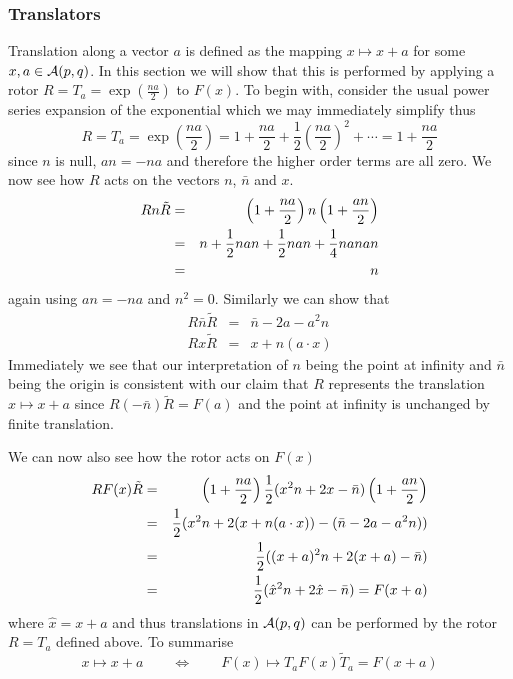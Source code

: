 \subsubsection{Translators}

Translation along a vector $a$ is defined as the
mapping $x\mapsto x+a$ for some $x,a \in \mathcal{A}(p,q)$. In this
section we will show that this is performed by applying a 
rotor $R=T_a = \exp\left({\frac{na}{2}}\right)$ to $F(x)$.
To begin with, consider the usual power series expansion of the exponential
which we may immediately simplify thus
%
\begin{equation}
R=T_a = \exp\left({\frac{na}{2}}\right) = 1 + \frac{na}{2} +
\frac{1}{2}\left(\frac{na}{2}\right)^2 + \cdots   = 1 +
\frac{na}{2}
\end{equation}
%
since $n$ is null, $an = -na$ and therefore the higher order terms are all
zero. We now see how $R$ acts on the vectors $n$, $\bar{n}$ and $x$.
%
\begin{eqnarray}
 Rn\tilde{R} & = & \left(1 + \frac{na}{2}\right)n\left(1 + \frac{an}{2}\right) \nonumber \\
                & = &  n + \frac{1}{2}nan + \frac{1}{2}nan + \frac{1}{4}nanan \nonumber \\
                & = & n
                \label{rntrans}
\end{eqnarray}
%
again using  $an= - na$ and $n^2=0$.    Similarly we can
show that
%
\begin{eqnarray}
 R\bar{n}\tilde{R} & = &  \bar{n}  - 2a - a^2n \\
 Rx\tilde{R}          & = &  x + n(a\cdot x)
\end{eqnarray}
%
Immediately we see that our interpretation of $n$ being the point at
infinity and $\bar{n}$ being the origin is consistent with our claim that
$R$ represents the translation $x \mapsto x+a$ since $R(-\bar{n})\tilde{R} = F(a)$
and the point at infinity is unchanged by finite translation.

We can now also see how the rotor acts on $F(x)$
%
\begin{eqnarray}
RF(x)\tilde{R} & = & \left(1 + \frac{na}{2}\right)\frac{1}{2}(x^2n + 2x - \bar{n})\left(1 + \frac{an}{2}\right) \nonumber \\
                & = &  \frac{1}{2}(x^2n + 2(x + n(a\cdot x)) - (\bar{n} - 2a - a^2n))   \nonumber \\
                & = &  \frac{1}{2}((x+a)^2n + 2(x+a) - \bar{n}) \nonumber \\
                & = &  \frac{1}{2}(\hat{x}^2 n + 2\hat{x} - \bar{n}) = F(x+a)
\end{eqnarray}
%
where $\hat{x}=x+a$ and thus translations in
${\mathcal{A}}(p,q)$ can be performed by the
rotor  $R=T_a$ defined above. To summarise
 \begin{equation}
x \mapsto x+a \qquad \Leftrightarrow \qquad F(x) \mapsto T_a
F(x) \tilde{T}_a = F(x+a)
\end{equation}

